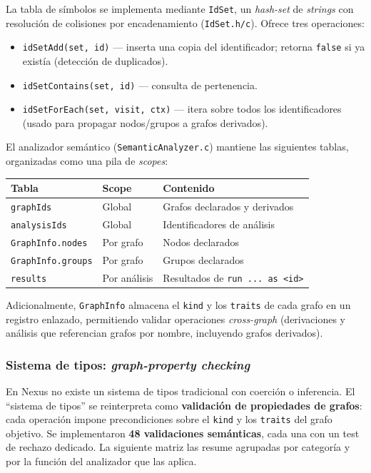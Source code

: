\documentclass[11pt,a4paper]{article}
\newcommand{\code}[1]{\texttt{#1}}
\begin{document}
La tabla de símbolos se implementa mediante \code{IdSet}, un \emph{hash-set} de
\emph{strings} con resolución de colisiones por encadenamiento
(\code{IdSet.h/c}). Ofrece tres operaciones:

\begin{itemize}[noitemsep]
  \item \code{idSetAdd(set, id)} --- inserta una copia del identificador;
        retorna \code{false} si ya existía (detección de duplicados).
  \item \code{idSetContains(set, id)} --- consulta de pertenencia.
  \item \code{idSetForEach(set, visit, ctx)} --- itera sobre todos los
        identificadores (usado para propagar nodos/grupos a grafos derivados).
\end{itemize}

El analizador semántico (\code{SemanticAnalyzer.c}) mantiene las siguientes
tablas, organizadas como una pila de \emph{scopes}:

\begin{center}
\begin{tabular}{@{}lll@{}}
\toprule
\textbf{Tabla} & \textbf{Scope} & \textbf{Contenido} \\
\midrule
\code{graphIds}        & Global       & Grafos declarados y derivados \\
\code{analysisIds}     & Global       & Identificadores de análisis \\
\code{GraphInfo.nodes} & Por grafo    & Nodos declarados \\
\code{GraphInfo.groups}& Por grafo    & Grupos declarados \\
\code{results}         & Por análisis & Resultados de \code{run ... as <id>} \\
\bottomrule
\end{tabular}
\end{center}

Adicionalmente, \code{GraphInfo} almacena el \code{kind} y los \code{traits} de
cada grafo en un registro enlazado, permitiendo validar operaciones
\emph{cross-graph} (derivaciones y análisis que referencian grafos por nombre,
incluyendo grafos derivados).

\subsubsection{Sistema de tipos: \emph{graph-property checking}}

En Nexus no existe un sistema de tipos tradicional con coerción o inferencia.
El ``sistema de tipos'' se reinterpreta como \textbf{validación de propiedades
de grafos}: cada operación impone precondiciones sobre el \code{kind} y los
\code{traits} del grafo objetivo. Se implementaron \textbf{48 validaciones
semánticas}, cada una con un test de rechazo dedicado. La siguiente matriz las
resume agrupadas por categoría y por la función del analizador que las aplica.
\end{document}
